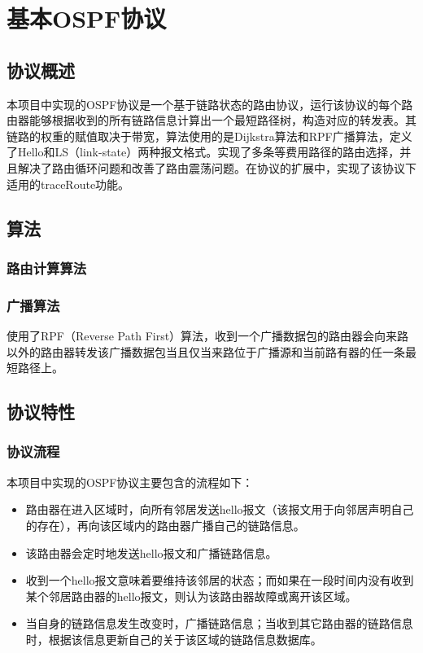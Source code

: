 \section{基本OSPF协议} %
\label{sec:ospf}
	\subsection{协议概述} %
	\label{sub:协议概述}
		本项目中实现的OSPF协议是一个基于链路状态的路由协议，运行该协议的每个路由器能够根据收到的所有链路信息计算出一个最短路径树，构造对应的转发表。其链路的权重的赋值取决于带宽，算法使用的是Dijkstra算法和RPF广播算法，定义了Hello和LS（link-state）两种报文格式。实现了多条等费用路径的路由选择，并且解决了路由循环问题和改善了路由震荡问题。在协议的扩展中，实现了该协议下适用的traceRoute功能。
	\subsection{算法} %
	\label{sub:算法}
		\subsubsection{路由计算算法} %
		\label{ssub:路由计算算法}
		
		\subsubsection{广播算法} %
		\label{ssub:广播算法}
			使用了RPF（Reverse Path First）算法，收到一个广播数据包的路由器会向来路以外的路由器转发该广播数据包当且仅当来路位于广播源和当前路有器的任一条最短路径上。
	\subsection{协议特性} %
	\label{sub:协议特性}
		\subsubsection{协议流程} %
		\label{ssub:协议流程}
		本项目中实现的OSPF协议主要包含的流程如下：
		\begin{itemize}
			\item 路由器在进入区域时，向所有邻居发送hello报文（该报文用于向邻居声明自己的存在），再向该区域内的路由器广播自己的链路信息。
			\item 该路由器会定时地发送hello报文和广播链路信息。
			\item 收到一个hello报文意味着要维持该邻居的状态；而如果在一段时间内没有收到某个邻居路由器的hello报文，则认为该路由器故障或离开该区域。
			\item 当自身的链路信息发生改变时，广播链路信息；当收到其它路由器的链路信息时，根据该信息更新自己的关于该区域的链路信息数据库。
		\end{itemize}		
